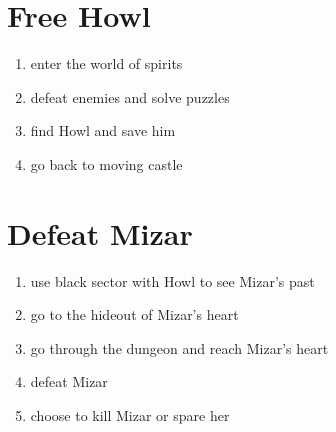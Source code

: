 \section{Free Howl}
\begin{enumerate}
\item enter the world of spirits
\item defeat enemies and solve puzzles
\item find Howl and save him
\item go back to moving castle
\end{enumerate}

\section{Defeat Mizar}
\begin{enumerate}
\item use black sector with Howl to see Mizar’s past
\item go to the hideout of Mizar’s heart
\item go through the dungeon and reach Mizar’s heart
\item defeat Mizar
\item choose to kill Mizar or spare her
\end{enumerate}
